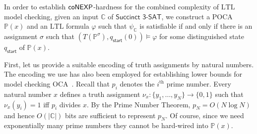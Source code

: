 \documentclass[times,envcountsame]{llncs}
\newcommand{\circuit}{\ensuremath{\mathbb{C}}}
\newcommand{\Poca}{\mathbb{P}}
\newcommand{\ltl}{\text{LTL}}
\newcommand{\ctl}{\text{CTL}}
\begin{document}

\noindent
In order to establish ${\mathsf{coNEXP}}$-hardness for the combined complexity
of $\ltl$ model checking, given an input $\circuit$ of
$\textsf{Succinct 3-SAT}$, we construct a POCA $\Poca(x)$ and an
$\ltl$ formula $\varphi$ such that $\psi_\circuit$ is satisfiable if
and only if there is an assignment $\sigma$ such that
$(T(\Poca^\sigma),q_{\mathsf{start}}(0))\models\varphi$ for some
distinguished state $q_{\mathsf{start}}$ of $\Poca(x)$.

First, let us provide a suitable encoding of truth assignments by
natural numbers. The encoding we use has also been employed for
establishing lower bounds for model checking OCA~\cite{JKMZ04-ic}.
Recall that $p_i$ denotes the $i^{\text{th}}$ prime number. Every
natural number $x$ defines a truth assignment
$\nu_x:\{y_1,\ldots,y_N\} \to \{ 0,1\}$ such that $\nu_x(y_i)=1$ iff
$p_i$ divides $x$.  By the Prime Number Theorem, $p_N=O(N \log N)$ and
hence $O(|\circuit|)$ bits are sufficient to represent $p_N$. Of
course, since we need exponentially many prime numbers they cannot be
hard-wired into $\Poca(x)$.

\end{document}
